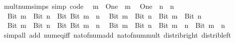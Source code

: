 \begin{isabellebody}
\endisatagproof
{\isafoldproof}%
%
\isadelimproof
\isanewline
%
\endisadelimproof
\isanewline
{}\isamarkupfalse%
\ mult{\isacharunderscore}{\kern0pt}num{\isacharunderscore}{\kern0pt}simps\ {\isacharbrackleft}{\kern0pt}simp{\isacharcomma}{\kern0pt}\ code{\isacharbrackright}{\kern0pt}{\isacharcolon}{\kern0pt}\isanewline
\ \ {\isachardoublequoteopen}m\ {\isacharasterisk}{\kern0pt}\ One\ {\isacharequal}{\kern0pt}\ m{\isachardoublequoteclose}\isanewline
\ \ {\isachardoublequoteopen}One\ {\isacharasterisk}{\kern0pt}\ n\ {\isacharequal}{\kern0pt}\ n{\isachardoublequoteclose}\isanewline
\ \ {\isachardoublequoteopen}Bit{}\ m\ {\isacharasterisk}{\kern0pt}\ Bit{}\ n\ {\isacharequal}{\kern0pt}\ Bit{}\ {\isacharparenleft}{\kern0pt}Bit{}\ {\isacharparenleft}{\kern0pt}m\ {\isacharasterisk}{\kern0pt}\ n{\isacharparenright}{\kern0pt}{\isacharparenright}{\kern0pt}{\isachardoublequoteclose}\isanewline
\ \ {\isachardoublequoteopen}Bit{}\ m\ {\isacharasterisk}{\kern0pt}\ Bit{}\ n\ {\isacharequal}{\kern0pt}\ Bit{}\ {\isacharparenleft}{\kern0pt}m\ {\isacharasterisk}{\kern0pt}\ Bit{}\ n{\isacharparenright}{\kern0pt}{\isachardoublequoteclose}\isanewline
\ \ {\isachardoublequoteopen}Bit{}\ m\ {\isacharasterisk}{\kern0pt}\ Bit{}\ n\ {\isacharequal}{\kern0pt}\ Bit{}\ {\isacharparenleft}{\kern0pt}Bit{}\ m\ {\isacharasterisk}{\kern0pt}\ n{\isacharparenright}{\kern0pt}{\isachardoublequoteclose}\isanewline
\ \ {\isachardoublequoteopen}Bit{}\ m\ {\isacharasterisk}{\kern0pt}\ Bit{}\ n\ {\isacharequal}{\kern0pt}\ Bit{}\ {\isacharparenleft}{\kern0pt}m\ {\isacharplus}{\kern0pt}\ n\ {\isacharplus}{\kern0pt}\ Bit{}\ {\isacharparenleft}{\kern0pt}m\ {\isacharasterisk}{\kern0pt}\ n{\isacharparenright}{\kern0pt}{\isacharparenright}{\kern0pt}{\isachardoublequoteclose}\isanewline
%
\isadelimproof
\ \ %
\endisadelimproof
%
\isatagproof
{}\isamarkupfalse%
\ {\isacharparenleft}{\kern0pt}simp{\isacharunderscore}{\kern0pt}all\ add{\isacharcolon}{\kern0pt}\ num{\isacharunderscore}{\kern0pt}eq{\isacharunderscore}{\kern0pt}iff\ nat{\isacharunderscore}{\kern0pt}of{\isacharunderscore}{\kern0pt}num{\isacharunderscore}{\kern0pt}add\ nat{\isacharunderscore}{\kern0pt}of{\isacharunderscore}{\kern0pt}num{\isacharunderscore}{\kern0pt}mult\ distrib{\isacharunderscore}{\kern0pt}right\ distrib{\isacharunderscore}{\kern0pt}left{\isacharparenright}{\kern0pt}%
\endisatagproof
{\isafoldproof}%
%
\isadelimproof

\end{isabellebody}
